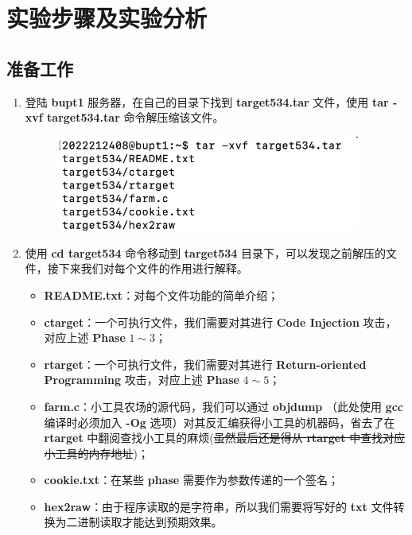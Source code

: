 \section{实验步骤及实验分析}
    \subsection{准备工作}
        \begin{enumerate}
            \item 登陆 \textbf{bupt1} 服务器，在自己的目录下找到 \textbf{target534.tar} 文件，使用 \textbf{tar -xvf target534.tar} 命令解压缩该文件。
                \begin{figure}[htbp]
                    \hspace*{1.5cm}
                    \includegraphics*[width = 10cm]{s0_0.png}
                \end{figure}
            \item 使用 \textbf{cd target534} 命令移动到 \textbf{target534} 目录下，可以发现之前解压的文件，接下来我们对每个文件的作用进行解释。
            \begin{itemize}
                \item \textbf{README.txt}：对每个文件功能的简单介绍；
                \item \textbf{ctarget}：一个可执行文件，我们需要对其进行 \textbf{Code Injection} 攻击，对应上述 \textbf{Phase} $1 \sim 3$；
                \item \textbf{rtarget}：一个可执行文件，我们需要对其进行 \textbf{Return-oriented Programming} 攻击，对应上述 \textbf{Phase} $4 \sim 5$；
                \item \textbf{farm.c}：小工具农场的源代码，我们可以通过 \textbf{objdump} （此处使用 \textbf{gcc} 编译时必须加入 \textbf{-Og} 选项）对其反汇编获得小工具的机器码，省去了在 \textbf{rtarget} 中翻阅查找小工具的麻烦(\sout{虽然最后还是得从 \textbf{rtarget} 中查找对应小工具的内存地址})；
                \item \textbf{cookie.txt}：在某些 \textbf{phase} 需要作为参数传递的一个签名；
                \item \textbf{hex2raw}：由于程序读取的是字符串，所以我们需要将写好的 \textbf{txt} 文件转换为二进制读取才能达到预期效果。

\end{itemize}
\end{enumerate}
